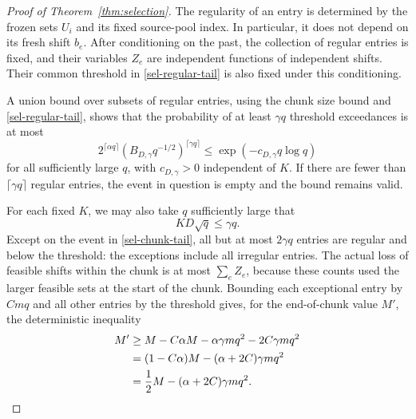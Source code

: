 \begin{proof}[Proof of Theorem~\ref{thm:selection}]
The regularity of an entry is determined by the frozen sets $U_i$ and
its fixed source-pool index.  In particular, it does not depend on its
fresh shift $b_e$.  After conditioning on the past, the collection of
regular entries is fixed, and their variables $Z_e$ are independent
functions of independent shifts.  Their common threshold in
\eqref{sel-regular-tail} is also fixed under this conditioning.

A union bound over subsets of regular entries, using the chunk size
bound and \eqref{sel-regular-tail}, shows that the probability of at
least $\gamma q$ threshold exceedances is at most
\begin{equation}\label{sel-chunk-tail}
 2^{\lceil\alpha q\rceil}
 \left(B_{D,\gamma}q^{-1/2}\right)^{\lceil\gamma q\rceil}
 \le \exp(-c_{D,\gamma}q\log q)
\end{equation}
for all sufficiently large $q$, with $c_{D,\gamma}>0$ independent of
$K$.  If there are fewer than $\lceil\gamma q\rceil$ regular entries,
the event in question is empty and the bound remains valid.

For each fixed $K$, we may also take $q$ sufficiently large that
\begin{equation}\label{sel-K-cutoff}
 KD\sqrt q\le\gamma q.
\end{equation}
Except on the event in \eqref{sel-chunk-tail}, all but at most
$2\gamma q$ entries are regular and below the threshold: the exceptions
include all irregular entries.  The actual loss of feasible shifts
within the chunk is at most $\sum_eZ_e$, because these counts used the
larger feasible sets at the start of the chunk.  Bounding each
exceptional entry by $Cmq$ and all other entries by the threshold gives,
for the end-of-chunk value $M'$, the deterministic inequality
\begin{align}
 M'
 &\ge M-C\alpha M-\alpha\gamma mq^2-2C\gamma mq^2
 \notag\\
 &=(1-C\alpha)M-(\alpha+2C)\gamma mq^2
 \notag\\
 &=\frac12M-(\alpha+2C)\gamma mq^2.
 \label{sel-chunk-recurrence}
\end{align}


\end{proof}
